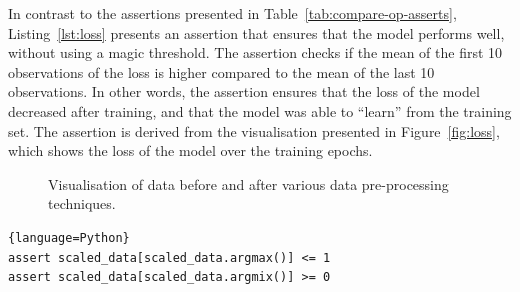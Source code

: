 \documentclass[conference]{IEEEtran}
\begin{document}
In contrast to the assertions presented in Table~\ref{tab:compare-op-asserts}, Listing~\ref{lst:loss} presents an assertion that ensures that the model performs well, without using a magic threshold. The assertion checks if the mean of the first 10 observations of the loss is higher compared to the mean of the last 10 observations. In other words, the assertion ensures that the loss of the model decreased after training, and that the model was able to ``learn'' from the training set. The assertion is derived from the visualisation presented in Figure~\ref{fig:loss}, which shows the loss of the model over the training epochs.

\begin{figure}
  \caption{Visualisation of data before and after various data pre-processing techniques.}
  \label{fig:data-pre-process}
\end{figure}

\begin{lstlisting}[caption={Assertion to check that the mix and max of a feature fall within specified threshold derived from the visualisation presented in Figure~\ref{fig:scale}.}, label={lst:scale}]{language=Python}
assert scaled_data[scaled_data.argmax()] <= 1
assert scaled_data[scaled_data.argmix()] >= 0
\end{lstlisting}
\end{document}
